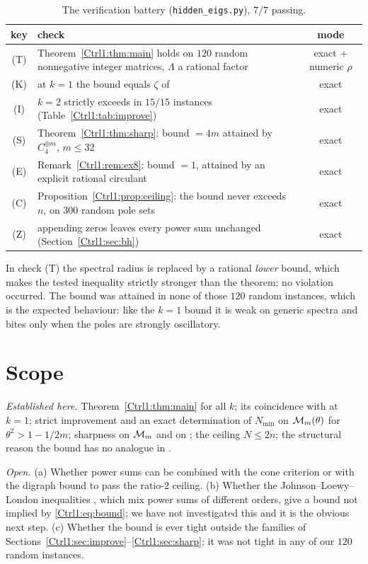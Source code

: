 \begin{table}[ht]
\centering\small
\begin{tabular}{cp{10.4cm}c}
\toprule
key & check & mode\\
\midrule
(T) & Theorem~\ref{Ctrl1:thm:main} holds on $120$ random nonnegative integer matrices, $\Lambda$ a rational factor & exact $+$ numeric $\rho$\\
(K) & at $k=1$ the bound equals $\zeta$ of \cite[Thm.~4.7]{Ben20ELA} & exact\\
(I) & $k=2$ strictly exceeds \cite[Thm.~4.7]{Ben20ELA} in $15/15$ instances (Table~\ref{Ctrl1:tab:improve}) & exact\\
(S) & Theorem~\ref{Ctrl1:thm:sharp}: bound $=4m$ attained by $C_4^{\oplus m}$, $m\le32$ & exact\\
(E) & Remark~\ref{Ctrl1:rem:ex8}: bound $=1$, attained by an explicit rational circulant & exact\\
(C) & Proposition~\ref{Ctrl1:prop:ceiling}: the bound never exceeds $n$, on $300$ random pole sets & exact\\
(Z) & appending zeros leaves every power sum unchanged (Section~\ref{Ctrl1:sec:bh}) & exact\\
\bottomrule
\end{tabular}
\caption{The verification battery (\texttt{hidden\_eigs.py}), $7/7$ passing.}
\label{Ctrl1:tab:battery}
\end{table}

In check (T) the spectral radius is replaced by a rational \emph{lower} bound, which makes
the tested inequality strictly stronger than the theorem; no violation occurred. The bound
was attained in none of those $120$ random instances, which is the expected behaviour: like
the $k=1$ bound it is weak on generic spectra and bites only when the poles are strongly
oscillatory.

\section{Scope}\label{Ctrl1:sec:scope}

\emph{Established here.} Theorem~\ref{Ctrl1:thm:main} for all $k$; its coincidence with
\cite[Thm.~4.7]{Ben20ELA} at $k=1$; strict improvement and an exact determination of
$N_{\min}$ on $\mathcal{M}_m(\theta)$ for $\theta^{2}>1-1/2m$; sharpness on $\mathcal{M}_m$ and on
\cite[Ex.~8]{BF04}; the ceiling $N\le2n$; the structural reason the bound has no analogue
in \cite{BH91,KOR00}.

\emph{Open.} (a) Whether power sums can be combined with the cone criterion \cite{BF04} or
with the digraph bound \cite{NM03} to pass the ratio-$2$ ceiling. (b) Whether the
Johnson--Loewy--London inequalities \cite{LoewyLondon78}, which mix power sums of different
orders, give a bound not implied by \eqref{Ctrl1:eq:bound}; we have not investigated this and it
is the obvious next step. (c) Whether the bound is ever tight outside the families of
Sections~\ref{Ctrl1:sec:improve}--\ref{Ctrl1:sec:sharp}; it was not tight in any of our $120$ random
instances.

